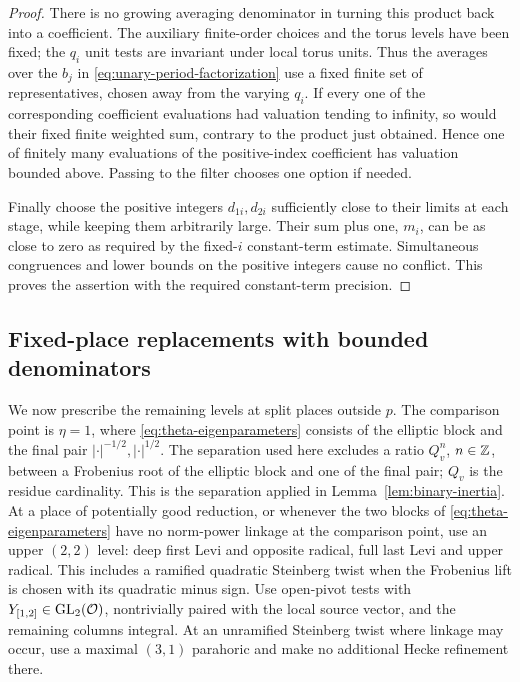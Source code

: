\begin{proof}
 There is no growing averaging denominator in turning this product
 back into a coefficient.  The auxiliary finite-order choices and
 the torus levels have been fixed; the $q_i$ unit tests are invariant
 under local torus units.  Thus the averages over the $b_j$ in
 \eqref{eq:unary-period-factorization} use a fixed finite set of
 representatives, chosen away from the varying $q_i$.  If every one
 of the corresponding coefficient evaluations had valuation tending
 to infinity, so would their fixed finite weighted sum, contrary to
 the product just obtained.  Hence one of finitely many evaluations
 of the positive-index coefficient has valuation bounded above.
 Passing to the filter chooses one option if needed.

 Finally choose the positive integers $d_{1i},d_{2i}$ sufficiently
 close to their limits at each stage, while keeping them arbitrarily
 large.  Their sum plus one, $m_i$, can be as close to zero as required by
 the fixed-$i$ constant-term estimate.  Simultaneous congruences and
 lower bounds on the positive integers cause no conflict.  This
 proves the assertion with the required constant-term precision.
\end{proof}

\subsection{Fixed-place replacements with bounded denominators}

We now prescribe the remaining levels at split places outside $p$.
The comparison point is $\eta=1$, where
\eqref{eq:theta-eigenparameters} consists of the elliptic block and the
final pair $|\cdot|^{-1/2},|\cdot|^{1/2}$.  The separation used here
excludes a ratio $Q_v^n$, $n\in\mathbb Z$, between a Frobenius root of the
elliptic block and one of the final pair; $Q_v$ is the residue
cardinality.  This is the separation applied in
Lemma~\ref{lem:binary-inertia}.
At a place of potentially good reduction, or whenever the two blocks of
\eqref{eq:theta-eigenparameters} have no norm-power linkage at the
comparison point, use an upper $(2,2)$ level: deep first Levi and
opposite radical, full last Levi and upper radical.  This includes a
ramified quadratic Steinberg twist when the Frobenius lift is chosen
with its quadratic minus sign.  Use open-pivot tests with
$Y_{[1,2]}\in\operatorname{GL}_2(\mathcal O)$, nontrivially paired with the local source
vector, and the remaining columns integral.  At an unramified Steinberg
twist where linkage may occur, use a maximal $(3,1)$ parahoric and make
no additional Hecke refinement there.

